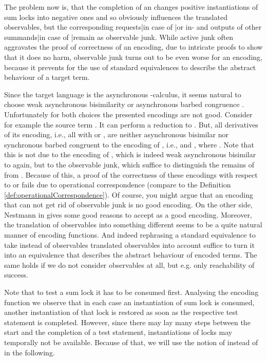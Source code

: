 \documentclass[]{llncs}
\begin{document}
The problem now is, that the completion of an \simulation changes positive instantiations of sum locks into negative ones and so obviously influences the translated observables, but the corresponding requests|in case of |or in- and outputs of other summands|in case of |remain as observable junk. While active junk often aggravates the proof of correctness of an encoding, due to intricate proofs to show that it does no harm, observable junk turns out to be even worse for an encoding, because it prevents for the use of standard equivalences to describe the abstract behaviour of a target term.

Since the target language is the asynchronous \piCal-calculus, it seems natural to choose weak asynchronous bisimilarity  or asynchronous barbed congruence . Unfortunately for both choices the presented encodings are not good. Consider for example the source term . It can perform a reduction to . But, all derivatives of its encoding, i.e., all  with  or , are neither asynchronous bisimilar nor synchronous barbed congruent to the encoding of , i.e.,  and , where . Note that this is not due to the encoding of , which is indeed weak asynchronous bisimilar to  again, but to the observable junk, which suffice to distinguish the remains of \simulations from . Because of this, a proof of the correctness of these encodings with respect to  or  fails due to operational correspondence (compare to the Definition \ref{def:operationalCorrespondence}). Of course, you might argue that an encoding that can not get rid of observable junk is no good encoding. On the other side, Nestmann in \cite{nestmann00} gives some good reasons to accept  as a good encoding. Moreover, the translation of observables into something different seems to be a quite natural manner of encoding functions. And indeed rephrasing a standard equivalence to take instead of observables translated observables into account suffice to turn it into an equivalence that describes the abstract behaviour of encoded terms. The same holds if we do not consider observables at all, but e.g. only reachability of success.

Note that to test a sum lock it has to be consumed first. Analysing the encoding function we observe that in each case an instantiation of sum lock is consumed, another instantiation of that lock is restored as soon as the respective test statement is completed. However, since there may lay many steps between the start and the completion of a test statement, instantiations of locks may temporally not be available. Because of that, we will use the notion of  instead of  in the following.
\end{document}
